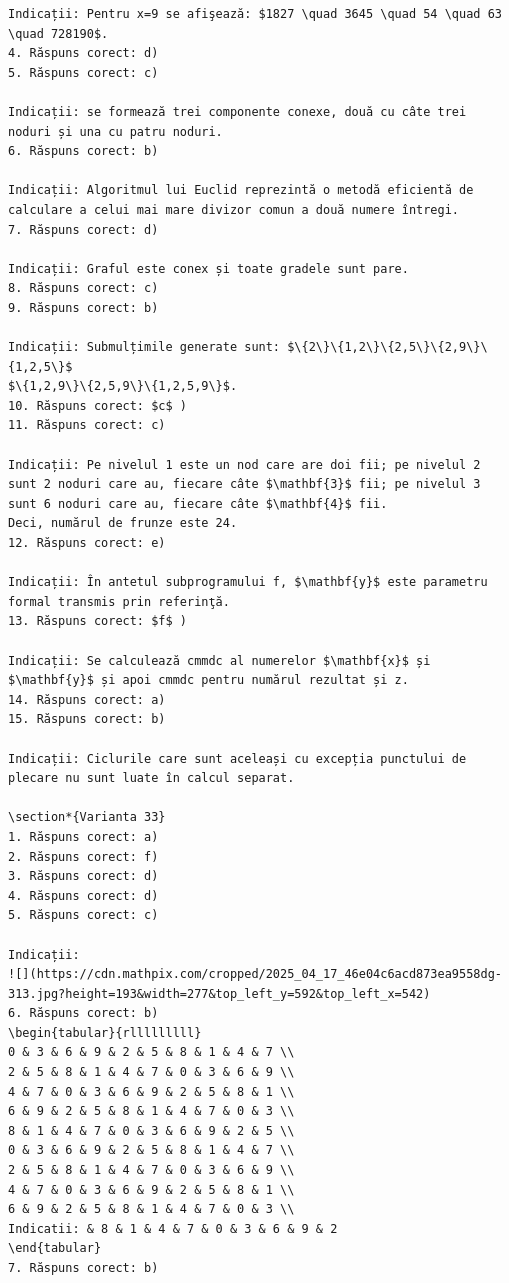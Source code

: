 \documentclass[10pt]{article}
\begin{document}
\begin{verbatim}
Indicații: Pentru x=9 se afişează: $1827 \quad 3645 \quad 54 \quad 63 \quad 728190$.
4. Răspuns corect: d)
5. Răspuns corect: c)

Indicații: se formează trei componente conexe, două cu câte trei noduri și una cu patru noduri.
6. Răspuns corect: b)

Indicații: Algoritmul lui Euclid reprezintă o metodă eficientă de calculare a celui mai mare divizor comun a două numere întregi.
7. Răspuns corect: d)

Indicații: Graful este conex și toate gradele sunt pare.
8. Răspuns corect: c)
9. Răspuns corect: b)

Indicații: Submulțimile generate sunt: $\{2\}\{1,2\}\{2,5\}\{2,9\}\{1,2,5\}$
$\{1,2,9\}\{2,5,9\}\{1,2,5,9\}$.
10. Răspuns corect: $c$ )
11. Răspuns corect: c)

Indicații: Pe nivelul 1 este un nod care are doi fii; pe nivelul 2 sunt 2 noduri care au, fiecare câte $\mathbf{3}$ fii; pe nivelul 3 sunt 6 noduri care au, fiecare câte $\mathbf{4}$ fii.
Deci, numărul de frunze este 24.
12. Răspuns corect: e)

Indicații: În antetul subprogramului f, $\mathbf{y}$ este parametru formal transmis prin referinţă.
13. Răspuns corect: $f$ )

Indicații: Se calculează cmmdc al numerelor $\mathbf{x}$ și $\mathbf{y}$ și apoi cmmdc pentru numărul rezultat și z.
14. Răspuns corect: a)
15. Răspuns corect: b)

Indicații: Ciclurile care sunt aceleași cu excepția punctului de plecare nu sunt luate în calcul separat.

\section*{Varianta 33}
1. Răspuns corect: a)
2. Răspuns corect: f)
3. Răspuns corect: d)
4. Răspuns corect: d)
5. Răspuns corect: c)

Indicații:
![](https://cdn.mathpix.com/cropped/2025_04_17_46e04c6acd873ea9558dg-313.jpg?height=193&width=277&top_left_y=592&top_left_x=542)
6. Răspuns corect: b)
\begin{tabular}{rlllllllll}
0 & 3 & 6 & 9 & 2 & 5 & 8 & 1 & 4 & 7 \\
2 & 5 & 8 & 1 & 4 & 7 & 0 & 3 & 6 & 9 \\
4 & 7 & 0 & 3 & 6 & 9 & 2 & 5 & 8 & 1 \\
6 & 9 & 2 & 5 & 8 & 1 & 4 & 7 & 0 & 3 \\
8 & 1 & 4 & 7 & 0 & 3 & 6 & 9 & 2 & 5 \\
0 & 3 & 6 & 9 & 2 & 5 & 8 & 1 & 4 & 7 \\
2 & 5 & 8 & 1 & 4 & 7 & 0 & 3 & 6 & 9 \\
4 & 7 & 0 & 3 & 6 & 9 & 2 & 5 & 8 & 1 \\
6 & 9 & 2 & 5 & 8 & 1 & 4 & 7 & 0 & 3 \\
Indicatii: & 8 & 1 & 4 & 7 & 0 & 3 & 6 & 9 & 2
\end{tabular}
7. Răspuns corect: b)


\end{verbatim}
\end{document}
